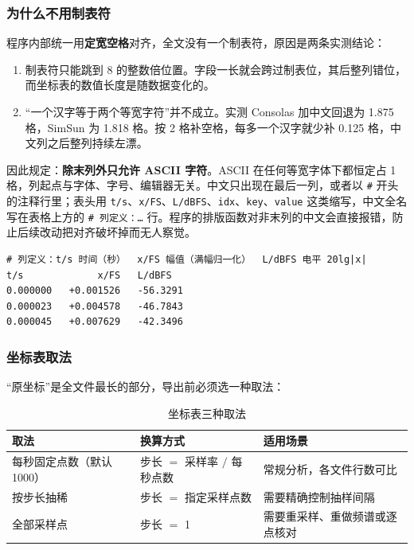 \documentclass[UTF8,a4paper,12pt,scheme=chinese]{ctexart}
\begin{document}
\subsubsection*{为什么不用制表符}

程序内部统一用\textbf{定宽空格}对齐，全文没有一个制表符，原因是两条实测结论：

\begin{enumerate}
  \item 制表符只能跳到 8 的整数倍位置。字段一长就会跨过制表位，其后整列错位，而坐标表的数值长度是随数据变化的。
  \item “一个汉字等于两个等宽字符”并不成立。实测 Consolas 加中文回退为 1.875 格，SimSun 为 1.818 格。按 2 格补空格，每多一个汉字就少补 0.125 格，中文列之后整列持续左漂。
\end{enumerate}

因此规定：\textbf{除末列外只允许 ASCII 字符}。ASCII 在任何等宽字体下都恒定占 1 格，列起点与字体、字号、编辑器无关。中文只出现在最后一列，或者以 \texttt{\#} 开头的注释行里；表头用 \texttt{t/s}、\texttt{x/FS}、\texttt{L/dBFS}、\texttt{idx}、\texttt{key}、\texttt{value} 这类缩写，中文全名写在表格上方的 \texttt{\# 列定义：…} 行。程序的排版函数对非末列的中文会直接报错，防止后续改动把对齐破坏掉而无人察觉。

\begin{center}
\begin{minipage}{0.96\textwidth}
\begin{lstlisting}
# 列定义：t/s 时间（秒）  x/FS 幅值（满幅归一化）  L/dBFS 电平 20lg|x|
t/s             x/FS   L/dBFS
0.000000   +0.001526   -56.3291
0.000023   +0.004578   -46.7843
0.000045   +0.007629   -42.3496
\end{lstlisting}
\end{minipage}
\end{center}

\subsubsection*{坐标表取法}

“原坐标”是全文件最长的部分，导出前必须选一种取法：

\begin{table}[htbp]
\centering
\caption{坐标表三种取法}
\begin{tabular}{@{}l p{4.1cm} p{5.4cm}@{}}
\toprule
取法 & 换算方式 & 适用场景 \\
\midrule
每秒固定点数（默认 1000） & 步长 $=$ 采样率 $/$ 每秒点数 & 常规分析，各文件行数可比 \\
按步长抽稀 & 步长 $=$ 指定采样点数 & 需要精确控制抽样间隔 \\
全部采样点 & 步长 $=$ 1 & 需要重采样、重做频谱或逐点核对 \\
\bottomrule
\end{tabular}
\end{table}
\end{document}
